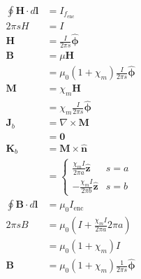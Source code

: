 \documentclass{article}
\renewcommand{\vec}[1]{\boldsymbol{\mathbf{#1}}}
\newcommand{\uvec}[1]{\hat{\vec{#1}}}
\begin{document}
\begin{align*}
  \oint \vec{H} \cdot d \vec{l} & = I_{f_\text{enc}}                                          \\
  2 \pi s H                     & = I                                                         \\
  \vec{H}                       & = \frac{I}{2 \pi s} \uvec{\phi}                             \\
  \vec{B}                       & = \mu \vec{H}                                               \\
                                & = \mu_0 (1 + \chi_m) \frac{I}{2 \pi s} \uvec{\phi}          \\
  \vec{M}                       & = \chi_m \vec{H}                                            \\
                                & = \chi_m \frac{I}{2 \pi s} \uvec{\phi}                      \\
  \vec{J}_b                     & = \nabla \times \vec{M}                                     \\
                                & = \vec{0}                                                   \\
  \vec{K}_b                     & = \vec{M} \times \uvec{n}                                   \\
                                & = \begin{cases}
                                      \frac{\chi_m I}{2 \pi a} \uvec{z}  & s = a \\
                                      -\frac{\chi_m I}{2 \pi b} \uvec{z} & s = b
                                    \end{cases}                \\
  \oint \vec{B} \cdot d \vec{l} & = \mu_0 I_\text{enc}                                        \\
  2 \pi s B                     & = \mu_0 \left( I + \frac{\chi_m I}{2 \pi a} 2 \pi a \right) \\
                                & = \mu_0 (1 + \chi_m) I                                      \\
  \vec{B}                       & = \mu_0 (1 + \chi_m) \frac{1}{2 \pi s} \uvec{\phi}
\end{align*}

\subsection{}
\end{document}
